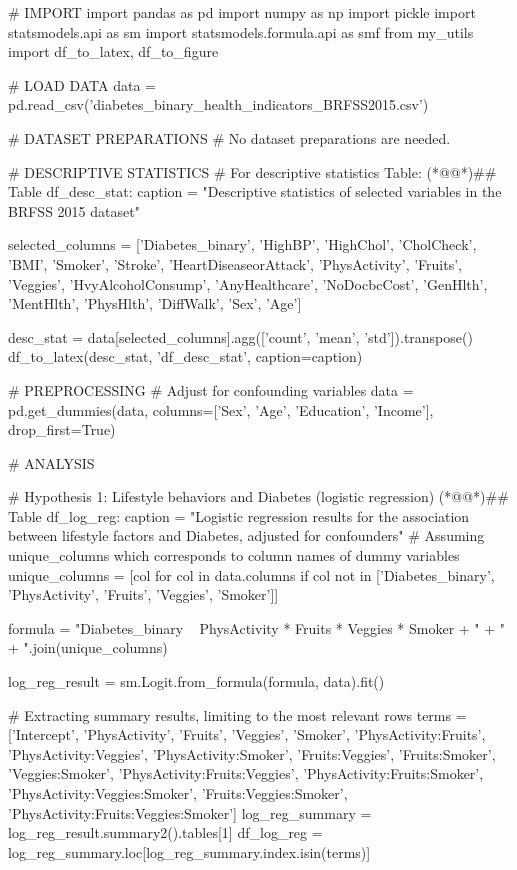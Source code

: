 \documentclass[11pt]{article}
\begin{document}
\begin{python}

# IMPORT
import pandas as pd
import numpy as np
import pickle
import statsmodels.api as sm
import statsmodels.formula.api as smf
from my_utils import df_to_latex, df_to_figure

# LOAD DATA
data = pd.read_csv('diabetes_binary_health_indicators_BRFSS2015.csv')

# DATASET PREPARATIONS
# No dataset preparations are needed.

# DESCRIPTIVE STATISTICS
# For descriptive statistics Table:
(*@@*)## Table df_desc_stat:
caption = "Descriptive statistics of selected variables in the BRFSS 2015 dataset"

selected_columns = ['Diabetes_binary', 'HighBP', 'HighChol', 'CholCheck', 'BMI', 'Smoker', 
                    'Stroke', 'HeartDiseaseorAttack', 'PhysActivity', 'Fruits', 'Veggies', 
                    'HvyAlcoholConsump', 'AnyHealthcare', 'NoDocbcCost', 'GenHlth', 'MentHlth', 
                    'PhysHlth', 'DiffWalk', 'Sex', 'Age']

desc_stat = data[selected_columns].agg(['count', 'mean', 'std']).transpose()
df_to_latex(desc_stat, 'df_desc_stat', caption=caption)

# PREPROCESSING
# Adjust for confounding variables 
data = pd.get_dummies(data, columns=['Sex', 'Age', 'Education', 'Income'], drop_first=True)

# ANALYSIS

# Hypothesis 1: Lifestyle behaviors and Diabetes (logistic regression)
(*@@*)## Table df_log_reg:
caption = "Logistic regression results for the association between lifestyle factors and Diabetes, adjusted for confounders"
# Assuming unique_columns which corresponds to column names of dummy variables
unique_columns = [col for col in data.columns if col not in ['Diabetes_binary', 'PhysActivity', 'Fruits', 'Veggies', 'Smoker']]

formula = "Diabetes_binary ~ PhysActivity * Fruits * Veggies * Smoker + " + " + ".join(unique_columns)

log_reg_result = sm.Logit.from_formula(formula, data).fit()

# Extracting summary results, limiting to the most relevant rows
terms = ['Intercept', 'PhysActivity', 'Fruits', 'Veggies', 'Smoker', 'PhysActivity:Fruits', 'PhysActivity:Veggies', 'PhysActivity:Smoker', 
         'Fruits:Veggies', 'Fruits:Smoker', 'Veggies:Smoker', 'PhysActivity:Fruits:Veggies', 'PhysActivity:Fruits:Smoker', 'PhysActivity:Veggies:Smoker', 
         'Fruits:Veggies:Smoker', 'PhysActivity:Fruits:Veggies:Smoker']
log_reg_summary = log_reg_result.summary2().tables[1]
df_log_reg = log_reg_summary.loc[log_reg_summary.index.isin(terms)]


\end{python}
\end{document}
